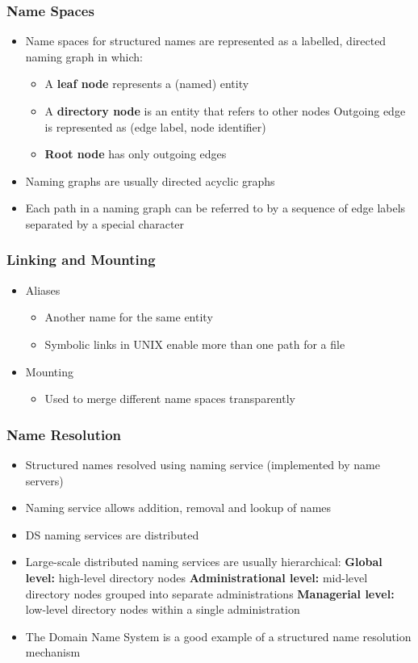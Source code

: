 \subsubsection{Name Spaces}
\begin{itemize}
	\item Name spaces for structured names are represented as a labelled, directed naming graph in which:
	\begin{itemize}
		\item A \textbf{leaf node} represents a (named) entity
		\item A \textbf{directory node} is an entity that refers to other nodes
		\subitem Outgoing edge is represented as (edge label, node identifier)
		\item \textbf{Root node} has only outgoing edges
	\end{itemize}
	\item Naming graphs are usually directed acyclic graphs
	\item Each path in a naming graph can be referred to by a sequence of edge labels separated by a special character	
\end{itemize}

\subsubsection{Linking and Mounting}
\begin{itemize}
	\item Aliases
	\begin{itemize}
		\item Another name for the same entity
		\item Symbolic links in UNIX enable more than one path for a file
	\end{itemize}
	\item Mounting
	\begin{itemize}
		\item Used to merge different name spaces transparently
	\end{itemize}	
\end{itemize}

\subsubsection{Name Resolution}
\begin{itemize}
	\item Structured names resolved using naming service (implemented by name servers)
	\item Naming service allows addition, removal and lookup of names
	\item DS naming services are distributed
	\item Large-scale distributed naming services are usually hierarchical:
	\subitem\textbf{Global level:} high-level directory nodes
	\subitem\textbf{Administrational level:} mid-level directory nodes grouped into separate administrations
	\subitem\textbf{Managerial level:} low-level directory nodes within a single administration
	\item The Domain Name System is a good example of a structured name resolution mechanism
\end{itemize}

